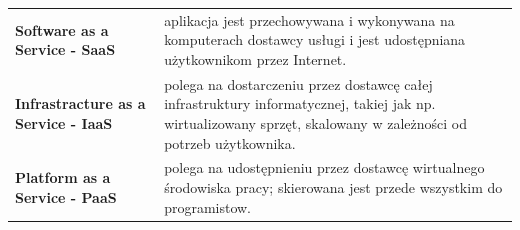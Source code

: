 \documentclass[a4paper]{article}
\begin{document}
        \begin{table}[H]
            \begin{center}
                \begin{tabular}{ p{.4\linewidth} p{.6\linewidth}}
                    \textbf{Software as a Service - SaaS}
                    &
                    aplikacja jest przechowywana i wykonywana na
                    komputerach dostawcy usługi i jest udostępniana
                    użytkownikom przez Internet.
                    \\

                    \cmidrule(r){1-1}\cmidrule(l){2-2}
                    \textbf{Infrastracture as a Service - IaaS}
                    &
                    polega na dostarczeniu przez dostawcę całej infrastruktury
                    informatycznej, takiej jak np. wirtualizowany sprzęt,
                    skalowany w zależności od potrzeb użytkownika.
                    \\

                    \cmidrule(r){1-1}\cmidrule(l){2-2}
                    \textbf{Platform as a Service - PaaS}
                    &
                    polega na udostępnieniu przez dostawcę wirtualnego
                    środowiska pracy; skierowana jest przede wszystkim do
                    programistow.
                    \\
                \end{tabular}
            \end{center}
        \end{table}
\end{document}

